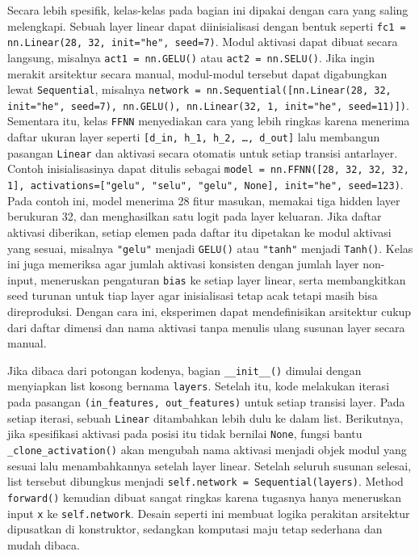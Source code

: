 \documentclass{article}
\begin{document}
Secara lebih spesifik, kelas-kelas pada bagian ini dipakai dengan cara yang saling melengkapi. Sebuah layer linear dapat diinisialisasi dengan bentuk seperti \texttt{fc1 = nn.Linear(28, 32, init="he", seed=7)}. Modul aktivasi dapat dibuat secara langsung, misalnya \texttt{act1 = nn.GELU()} atau \texttt{act2 = nn.SELU()}. Jika ingin merakit arsitektur secara manual, modul-modul tersebut dapat digabungkan lewat \texttt{Sequential}, misalnya \texttt{network = nn.Sequential([nn.Linear(28, 32, init="he", seed=7), nn.GELU(), nn.Linear(32, 1, init="he", seed=11)])}. Sementara itu, kelas \texttt{FFNN} menyediakan cara yang lebih ringkas karena menerima daftar ukuran layer seperti \texttt{[d\_in, h\_1, h\_2, \dots, d\_out]} lalu membangun pasangan \texttt{Linear} dan aktivasi secara otomatis untuk setiap transisi antarlayer. Contoh inisialisasinya dapat ditulis sebagai \texttt{model = nn.FFNN([28, 32, 32, 32, 1], activations=["gelu", "selu", "gelu", None], init="he", seed=123)}. Pada contoh ini, model menerima 28 fitur masukan, memakai tiga hidden layer berukuran 32, dan menghasilkan satu logit pada layer keluaran. Jika daftar aktivasi diberikan, setiap elemen pada daftar itu dipetakan ke modul aktivasi yang sesuai, misalnya \texttt{"gelu"} menjadi \texttt{GELU()} atau \texttt{"tanh"} menjadi \texttt{Tanh()}. Kelas ini juga memeriksa agar jumlah aktivasi konsisten dengan jumlah layer non-input, meneruskan pengaturan \texttt{bias} ke setiap layer linear, serta membangkitkan seed turunan untuk tiap layer agar inisialisasi tetap acak tetapi masih bisa direproduksi. Dengan cara ini, eksperimen dapat mendefinisikan arsitektur cukup dari daftar dimensi dan nama aktivasi tanpa menulis ulang susunan layer secara manual.

Jika dibaca dari potongan kodenya, bagian \texttt{\_\_init\_\_()} dimulai dengan menyiapkan list kosong bernama \texttt{layers}. Setelah itu, kode melakukan iterasi pada pasangan \texttt{(in\_features, out\_features)} untuk setiap transisi layer. Pada setiap iterasi, sebuah \texttt{Linear} ditambahkan lebih dulu ke dalam list. Berikutnya, jika spesifikasi aktivasi pada posisi itu tidak bernilai \texttt{None}, fungsi bantu \texttt{\_clone\_activation()} akan mengubah nama aktivasi menjadi objek modul yang sesuai lalu menambahkannya setelah layer linear. Setelah seluruh susunan selesai, list tersebut dibungkus menjadi \texttt{self.network = Sequential(layers)}. Method \texttt{forward()} kemudian dibuat sangat ringkas karena tugasnya hanya meneruskan input \texttt{x} ke \texttt{self.network}. Desain seperti ini membuat logika perakitan arsitektur dipusatkan di konstruktor, sedangkan komputasi maju tetap sederhana dan mudah dibaca.
\end{document}
